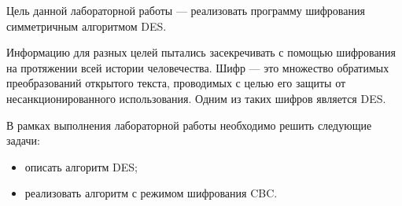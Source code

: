 \Introduction

Цель данной лабораторной работы --- реализовать программу шифрования симметричным алгоритмом DES.

Информацию для разных целей пытались засекречивать с помощью шифрования на протяжении всей истории человечества. Шифр --- это множество обратимых преобразований открытого текста, проводимых с целью его защиты от несанкционированного использования. Одним из таких шифров является DES.

В рамках выполнения лабораторной работы необходимо решить следующие задачи: 
\begin{itemize}
	\item описать алгоритм DES;
	\item реализовать алгоритм с режимом шифрования CBC.
\end{itemize}